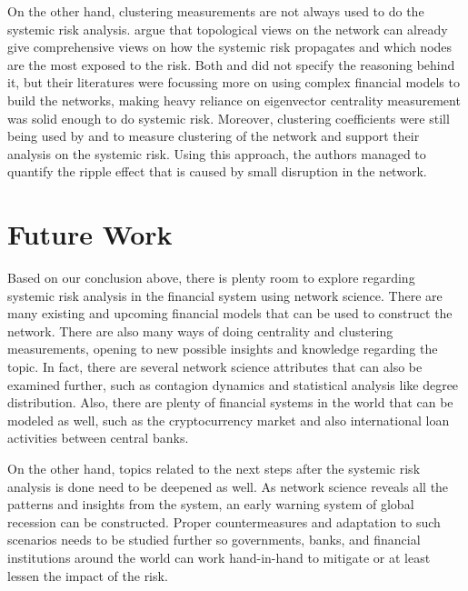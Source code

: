 \documentclass[a4paper,11pt]{article}
\begin{document}
On the other hand, clustering measurements are not always used to do the systemic risk analysis. \cite{Battiston_Puliga_Kaushik_Tasca_Caldarelli_2012}  argue that topological views on the network can already give comprehensive views on how the systemic risk propagates and which nodes are the most exposed to the risk. Both \cite{Duan_El_Ghoul_Guedhami_Li_Li_2020} and \cite{Zhang_Yin_Sha_2023} did not specify the reasoning behind it, but their literatures were focussing more on using complex financial models to build the networks, making heavy reliance on eigenvector centrality measurement was solid enough to do systemic risk. Moreover, clustering coefficients were still being used by \cite{Lai_Hu_2021} and \cite{Markose_Giansante_Shaghaghi_2012} to measure clustering of the network and support their analysis on the systemic risk. Using this approach, the authors managed to quantify the ripple effect that is caused by small disruption in the network.

\section{Future Work}
Based on our conclusion above, there is plenty room to explore regarding systemic risk analysis in the financial system using network science. There are many existing and upcoming financial models that can be used to construct the network. There are also many ways of doing centrality and clustering measurements, opening to new possible insights and knowledge regarding the topic. In fact, there are several network science attributes that can also be examined further, such as contagion dynamics and statistical analysis like degree distribution. Also, there are plenty of financial systems in the world that can be modeled as well, such as the cryptocurrency market and also international loan activities between central banks.

On the other hand, topics related to the next steps after the systemic risk analysis is done need to be deepened as well. As network science reveals all the patterns and insights from the system, an early warning system of global recession can be constructed. Proper countermeasures and adaptation to such scenarios needs to be studied further so governments, banks, and financial institutions around the world can work hand-in-hand to mitigate or at least lessen the impact of the risk.




\small

\end{document}
